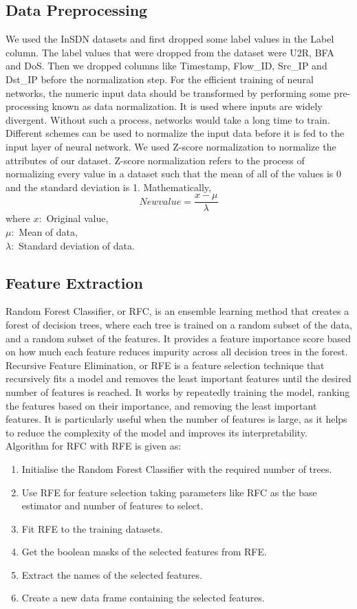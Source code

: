 \subsection{Data Preprocessing}
\vspace{-18pt}
We used the InSDN datasets and first dropped some label values in the Label column. The label values that were dropped from the dataset were U2R, BFA and DoS. Then we dropped columns like Timestamp, Flow\_ID, Src\_IP and Dst\_IP before the normalization step. For the efficient training of neural networks, the numeric input data should be transformed by performing some pre-processing known as data normalization. It is used where inputs are widely divergent. Without such a process, networks would take a long time to train. Different schemes can be used to normalize the input data before it is fed to the input layer of neural network. We used Z-score normalization to normalize the attributes of our dataset. Z-score normalization refers to the process of normalizing every value in a dataset such that the mean of all of the values is 0 and the standard deviation is 1. Mathematically,
\begin{equation}
New value = \frac{x- \mu}{\lambda}
\end{equation}
where $x: $ Original value,\\ $\mu: $ Mean of data,\\ $\lambda: $ Standard deviation of data.
\subsection{Feature Extraction}
\vspace{-18pt}
Random Forest Classifier, or RFC, is an ensemble learning method that creates a forest of decision trees, where each tree is trained on a random subset of the data, and a random subset of the features. It provides a feature importance score based on how much each feature reduces impurity across all decision trees in the forest. Recursive Feature Elimination, or RFE is a feature selection technique that recursively fits a model and removes the least important features until the desired number of features is reached. It works by repeatedly training the model, ranking the features based on their importance, and removing the least important features. It is particularly useful when the number of features is large, as it helps to reduce the complexity of the model and improves its interpretability.
Algorithm for RFC with RFE is given as:
\begin{enumerate}[label=\roman*.]
\item Initialise the Random Forest Classifier with the required number of trees.
\item Use RFE for feature selection taking parameters like RFC as the base estimator and number of features to select.
\item Fit RFE to the training datasets.
\item Get the boolean masks of the selected features from RFE.
\item Extract the names of the selected features.
\item Create a new data frame containing the selected features.
\end{enumerate}
